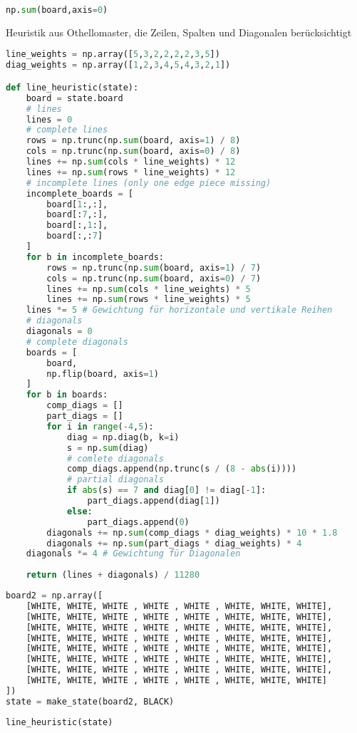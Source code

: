 \begin{lstlisting}[language=Python]
np.sum(board,axis=0)
\end{lstlisting}

Heuristik aus Othellomaster, die Zeilen, Spalten und Diagonalen
berücksichtigt

\begin{lstlisting}[language=Python]
line_weights = np.array([5,3,2,2,2,2,3,5])
diag_weights = np.array([1,2,3,4,5,4,3,2,1])

def line_heuristic(state):
    board = state.board
    # lines
    lines = 0
    # complete lines
    rows = np.trunc(np.sum(board, axis=1) / 8)
    cols = np.trunc(np.sum(board, axis=0) / 8)
    lines += np.sum(cols * line_weights) * 12
    lines += np.sum(rows * line_weights) * 12
    # incomplete lines (only one edge piece missing)
    incomplete_boards = [
        board[1:,:],
        board[:7,:],
        board[:,1:],
        board[:,:7]
    ]
    for b in incomplete_boards:
        rows = np.trunc(np.sum(board, axis=1) / 7)
        cols = np.trunc(np.sum(board, axis=0) / 7)
        lines += np.sum(cols * line_weights) * 5
        lines += np.sum(rows * line_weights) * 5
    lines *= 5 # Gewichtung für horizontale und vertikale Reihen
    # diagonals
    diagonals = 0
    # complete diagonals
    boards = [
        board,
        np.flip(board, axis=1)
    ]
    for b in boards:
        comp_diags = []
        part_diags = []
        for i in range(-4,5):
            diag = np.diag(b, k=i)
            s = np.sum(diag)
            # comlete diagonals
            comp_diags.append(np.trunc(s / (8 - abs(i))))
            # partial diagonals
            if abs(s) == 7 and diag[0] != diag[-1]:
                part_diags.append(diag[1])
            else:
                part_diags.append(0)
        diagonals += np.sum(comp_diags * diag_weights) * 10 * 1.8
        diagonals += np.sum(part_diags * diag_weights) * 4
    diagonals *= 4 # Gewichtung für Diagonalen
    
    return (lines + diagonals) / 11280
\end{lstlisting}

\begin{lstlisting}[language=Python]
board2 = np.array([
    [WHITE, WHITE, WHITE , WHITE , WHITE , WHITE, WHITE, WHITE],
    [WHITE, WHITE, WHITE , WHITE , WHITE , WHITE, WHITE, WHITE],
    [WHITE, WHITE, WHITE , WHITE , WHITE , WHITE, WHITE, WHITE],
    [WHITE, WHITE, WHITE , WHITE , WHITE , WHITE, WHITE, WHITE],
    [WHITE, WHITE, WHITE , WHITE , WHITE , WHITE, WHITE, WHITE],
    [WHITE, WHITE, WHITE , WHITE , WHITE , WHITE, WHITE, WHITE],
    [WHITE, WHITE, WHITE , WHITE , WHITE , WHITE, WHITE, WHITE],
    [WHITE, WHITE, WHITE , WHITE , WHITE , WHITE, WHITE, WHITE]
])
state = make_state(board2, BLACK)
\end{lstlisting}

\begin{lstlisting}[language=Python]
line_heuristic(state)
\end{lstlisting}
